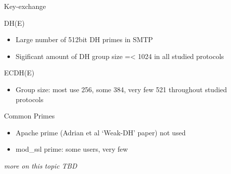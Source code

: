 \begin{frame}{Key-exchange}

\begin{block}{DH(E)}

\begin{itemize}
\itemsep1pt\parskip0pt
\item
  Large number of 512bit DH primes in SMTP
\item
  Sigificant amount of DH group size =\textless{} 1024 in all studied
  protocols
\end{itemize}

\end{block}

\begin{block}{ECDH(E)}

\begin{itemize}
\itemsep1pt\parskip0pt
\item
  Group size: most use 256, some 384, very few 521 throughout studied
  protocols
\end{itemize}

\end{block}

\begin{block}{Common Primes}

\begin{itemize}
\itemsep1pt\parskip0pt
\item
  Apache prime (Adrian et al `Weak-DH' paper) not used
\item
  mod\_ssl prime: some users, very few
\end{itemize}

\emph{more on this topic TBD}

\end{block}

\end{frame}

